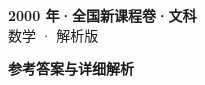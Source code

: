 \documentclass[zihao=-4, a4paper]{ctexart}
\begin{document}
\begin{center}
  {\Large\bfseries 2000 年·全国新课程卷·文科}\\[4pt]
  {\large 数学 · 解析版}
\end{center}
\medskip
{}

\clearpage
{}
\begin{center}{\Large\bfseries 参考答案与详细解析}\end{center}
\medskip

\end{document}
